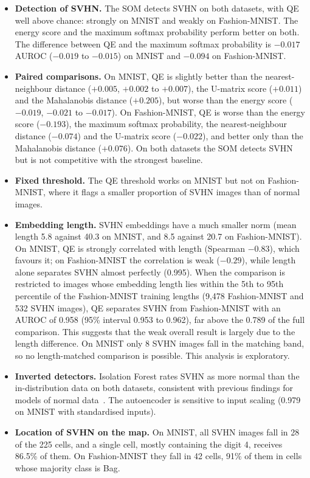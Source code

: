 \documentclass{scrartcl}
\begin{document}
\begin{itemize}
  \item \textbf{Detection of SVHN.} The SOM detects SVHN on both datasets, with QE well above chance: strongly on MNIST and weakly on Fashion-MNIST. The energy score and the maximum softmax probability perform better on both. The difference between QE and the maximum softmax probability is $-0.017$ AUROC ($-0.019$ to $-0.015$) on MNIST and $-0.094$ on Fashion-MNIST.
  \item \textbf{Paired comparisons.} On MNIST, QE is slightly better than the nearest-neighbour distance ($+0.005$, $+0.002$ to $+0.007$), the U-matrix score ($+0.011$) and the Mahalanobis distance ($+0.205$), but worse than the energy score ($-0.019$, $-0.021$ to $-0.017$). On Fashion-MNIST, QE is worse than the energy score ($-0.193$), the maximum softmax probability, the nearest-neighbour distance ($-0.074$) and the U-matrix score ($-0.022$), and better only than the Mahalanobis distance ($+0.076$). On both datasets the SOM detects SVHN but is not competitive with the strongest baseline.
  \item \textbf{Fixed threshold.} The QE threshold works on MNIST but not on Fashion-MNIST, where it flags a smaller proportion of SVHN images than of normal images.
  \item \textbf{Embedding length.} SVHN embeddings have a much smaller norm (mean length 5.8 against 40.3 on MNIST, and 8.5 against 20.7 on Fashion-MNIST). On MNIST, QE is strongly correlated with length (Spearman $-0.83$), which favours it; on Fashion-MNIST the correlation is weak ($-0.29$), while length alone separates SVHN almost perfectly (0.995). When the comparison is restricted to images whose embedding length lies within the 5th to 95th percentile of the Fashion-MNIST training lengths (9,478 Fashion-MNIST and 532 SVHN images), QE separates SVHN from Fashion-MNIST with an AUROC of 0.958 (95\% interval 0.953 to 0.962), far above the 0.789 of the full comparison. This suggests that the weak overall result is largely due to the length difference. On MNIST only 8 SVHN images fall in the matching band, so no length-matched comparison is possible. This analysis is exploratory.
  \item \textbf{Inverted detectors.} Isolation Forest rates SVHN as more normal than the in-distribution data on both datasets, consistent with previous findings for models of normal data~\cite{nalisnick2019deep}. The autoencoder is sensitive to input scaling (0.979 on MNIST with standardised inputs).
  \item \textbf{Location of SVHN on the map.} On MNIST, all SVHN images fall in 28 of the 225 cells, and a single cell, mostly containing the digit 4, receives 86.5\% of them. On Fashion-MNIST they fall in 42 cells, 91\% of them in cells whose majority class is Bag.
\end{itemize}
\end{document}
